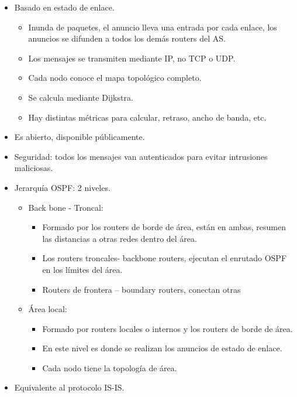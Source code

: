 \documentclass[12pt, twoside, openright]{report} %
\begin{document}
      \begin{itemize}
      \item
        Basado en estado de enlace.

        \begin{itemize}
        \item
          Inunda de paquetes, el anuncio lleva una entrada por cada
          enlace, los anuncios se difunden a todos los demás routers del
          AS.
        \item
          Los mensajes se transmiten mediante IP, no TCP o UDP.
        \item
          Cada nodo conoce el mapa topológico completo.
        \item
          Se calcula mediante Dijkstra.
        \item
          Hay distintas métricas para calcular, retraso, ancho de banda,
          etc.
        \end{itemize}
      \item
        Es abierto, disponible públicamente.
      \item
        Seguridad: todos los mensajes van autenticados para evitar
        intrusiones maliciosas.
      \item
        Jerarquía OSPF: 2 niveles.

        \begin{itemize}
        \item
          Back bone - Troncal:

          \begin{itemize}
          \item
            Formado por los routers de borde de área, están en ambas,
            resumen las distancias a otras redes dentro del área.
          \item
            Los routers troncales- backbone routers, ejecutan el
            enrutado OSPF en los límites del área.
          \item
            Routers de frontera -- boundary routers, conectan otras
          \end{itemize}
        \item
          Área local:

          \begin{itemize}
          \item
            Formado por routers locales o internos y los routers de
            borde de área.
          \item
            En este nivel es donde se realizan los anuncios de estado de
            enlace.
          \item
            Cada nodo tiene la topología de área.
          \end{itemize}
        \end{itemize}
      \item
        Equivalente al protocolo IS-IS.
      \end{itemize}
\end{document}
